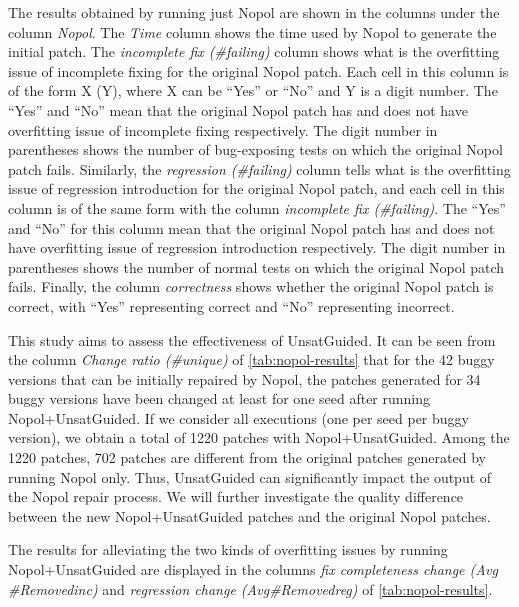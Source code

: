 The results obtained by running just Nopol are shown in the columns under the column \emph{Nopol}. 
The \emph{Time} column shows the time used by Nopol to generate the initial patch. 
The \emph{incomplete fix (\#failing)} column shows what is the overfitting issue of incomplete fixing for the original Nopol patch. 
Each cell in this column is of the form X (Y), where X can be ``Yes'' or ``No'' and Y is a digit number. 
The ``Yes'' and ``No'' mean that the original Nopol patch has and does not have overfitting issue of incomplete fixing respectively. 
The digit number in parentheses shows the number of bug-exposing tests on which the original Nopol patch fails. 
Similarly, the \emph{regression (\#failing)} column tells what is the overfitting issue of regression introduction for the original Nopol patch, and each cell in this column is of the same form with the column \emph{incomplete fix (\#failing)}. 
The ``Yes'' and ``No'' for this column mean that the original Nopol patch has and does not have overfitting issue of regression introduction respectively. 
The digit number in parentheses shows the number of normal tests on which the original Nopol patch fails. 
Finally, the column \emph{correctness} shows whether the original Nopol patch is correct, with ``Yes'' representing correct and ``No'' representing incorrect.

\begin{landscape}
	
\end{landscape}

This study aims to assess the effectiveness of UnsatGuided. 
It can be seen from the column \emph{Change ratio (\#unique)} of \autoref{tab:nopol-results} that for the 42 buggy versions that can be initially repaired by Nopol, the patches generated for 34 buggy versions have been changed at least for one seed after running Nopol+UnsatGuided. 
If we consider all executions (one per seed per buggy version), we obtain a total of 1220 patches with Nopol+UnsatGuided. 
Among the 1220 patches, 702 patches are different from the original patches generated by running Nopol only. 
Thus, UnsatGuided can significantly impact the output of the Nopol repair process. 
We will further investigate the quality difference between the new Nopol+UnsatGuided patches and the original Nopol patches. 

The results for alleviating the two kinds of overfitting issues by running Nopol+UnsatGuided are displayed in the columns \emph{fix completeness change (Avg \#Removedinc)} and \emph{regression change (Avg\#Removedreg)} of \autoref{tab:nopol-results}.

